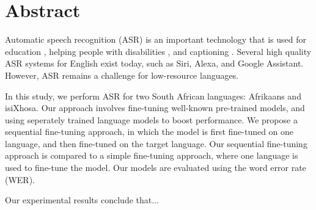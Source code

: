 \chapter*{Abstract}
\makeatletter{}\makeatother
%
%
%
%
Automatic speech recognition (ASR) is an important technology that is used for education \cite{wald2005using}, 
helping people with disabilities \cite{terbeh2013automatic}, and captioning \cite{wald2006captioning}.
Several high quality ASR systems for English exist today, such as Siri, Alexa, and Google Assistant. However, ASR remains a challenge for low-resource languages. 

In this study, we perform ASR for two South African languages: Afrikaans and isiXhosa.
Our approach involves fine-tuning well-known pre-trained models, and using seperately trained language models to boost performance.
We propose a sequential fine-tuning approach, in which the model is first fine-tuned on one language, and then fine-tuned on the target language.
Our sequential fine-tuning approach is compared to a simple fine-tuning approach, where one language is used to fine-tune the model.
Our models are evaluated using the word error rate (WER).

Our experimental results conclude that...



